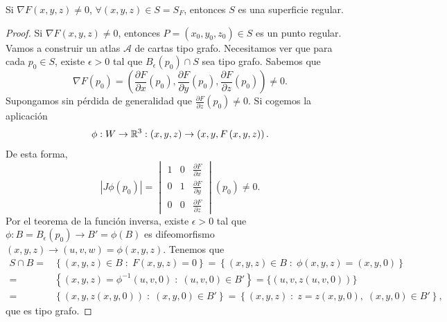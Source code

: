 \begin{theorem}
Si $\displaystyle \nabla F\left(x,y,z\right)\neq 0 $, $\displaystyle \forall \left(x,y,z\right)\in S = S_{F} $, entonces $\displaystyle S $ es una superficie regular.
\end{theorem}
\begin{proof}
Si $\displaystyle \nabla F\left(x,y,z\right)\neq 0 $, entonces $\displaystyle P = \left(x_{0}, y_{0}, z_{0}\right)\in S $ es un punto regular. Vamos a construir un atlas $\displaystyle \mathcal{A} $ de cartas tipo grafo. 
Necesitamos ver que para cada $\displaystyle p_{0} \in S $, existe $\displaystyle \epsilon > 0 $ tal que $\displaystyle B_{\epsilon }\left(p_{0}\right)\cap S $ sea tipo grafo. Sabemos que 
\[\nabla F\left(p_{0}\right) = \left(\frac{\partial F}{\partial x}\left(p_{0}\right), \frac{\partial F}{\partial y}\left(p_{0}\right), \frac{\partial F}{\partial z}\left(p_{0}\right)\right)\neq 0 .\]
Supongamos sin pérdida de generalidad que $\displaystyle \frac{\partial F}{\partial z}\left(p_{0}\right)\neq 0 $. Si cogemos la aplicación
\[ \phi : W \to \mathbb{R}^{3} : \left(x,y,z\right)\to \left(x,y,F\left(x,y,z\right)\right) .\]
De esta forma, 
\[ \left|J\phi\left(p_{0}\right)\right| = \begin{vmatrix} 1 & 0 & \frac{\partial F}{\partial x} \\ 0 & 1 & \frac{\partial F}{\partial y} \\ 0 & 0 & \frac{\partial F}{\partial z} \end{vmatrix} \left(p_{0}\right)\neq 0 .\]
Por el teorema de la función inversa, existe $\displaystyle \epsilon > 0 $ tal que $\displaystyle \phi : B = B_{\epsilon }\left(p_{0}\right) \to B' = \phi\left(B\right) $ es difeomorfismo $\displaystyle \left(x,y,z\right)\to \left(u,v,w\right)=\phi\left(x,y,z\right) $. Tenemos que 
\[
\begin{split}
	S \cap B = & \left\{ \left(x,y,z\right)\in B \; : \; F\left(x,y,z\right)= 0\right\}  = \left\{ \left(x,y,z\right)\in B \; : \; \phi\left(x,y,z\right)=\left(x,y,0\right)\right\} \\
	= & \left\{ \left(x,y,z\right)=\phi^{-1}\left(u,v,0\right) \; : \; \left(u,v,0\right)\in B'\right\} = \{\left(u,v,z\left(u,v,0\right)\right)\} \\
	= & \left\{ \left(x,y,z\left(x,y,0\right)\right)\; : \; \left(x,y,0\right)\in B'\right\} = \left\{ \left(x,y,z\right) \; : \; z = z\left(x,y,0\right), \; \left(x,y,0\right)\in B'\right\} ,
\end{split}
\]
que es tipo grafo.
\end{proof}

